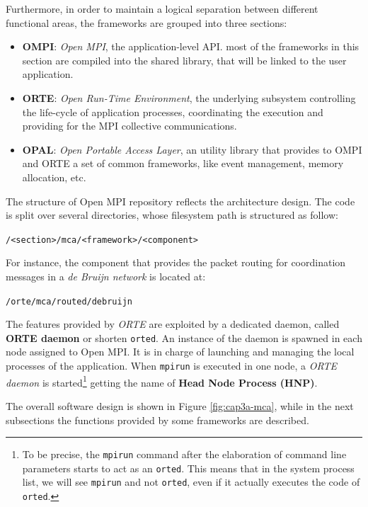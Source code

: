 Furthermore, in order to maintain a logical separation between different
functional areas, the frameworks are grouped into three sections:
\begin{itemize}
\item \textbf{OMPI}: \emph{Open MPI}, the application-level API.
                     most of the frameworks in this section are compiled into
                     the shared library, that will be linked to the user
                     application.  
\item \textbf{ORTE}: \emph{Open Run-Time Environment}, the underlying
                     subsystem controlling the life-cycle of application
                     processes, coordinating the execution and providing for
                     the MPI collective communications.
\item \textbf{OPAL}: \emph{Open Portable Access Layer}, an utility library
                     that provides to OMPI and ORTE a set of common frameworks,
                     like event management, memory allocation, etc.
\end{itemize}

The structure of Open MPI repository reflects the architecture design. The code
is split over several directories, whose filesystem path is structured
as follow:

\texttt{/<section>/mca/<framework>/<component>}

For instance, the component that provides the packet routing for coordination
messages in a \emph{de Bruijn network} is located at:

\texttt{/orte/mca/routed/debruijn}

The features provided by \emph{ORTE} are exploited by a dedicated daemon, called
\textbf{ORTE daemon} or shorten \texttt{orted}. An instance of the daemon is
spawned in each
node assigned to Open MPI. It is in charge of launching and managing the local
processes of the application. When \texttt{mpirun} is executed in one node, a
\emph{ORTE daemon} is started\footnote{To be precise, the \texttt{mpirun}
command after the elaboration of command line parameters starts to act as an
\texttt{orted}. This means that in the system
process list, we will see \texttt{mpirun} and not \texttt{orted}, even if it
actually executes the code of \texttt{orted}.} getting
the name of \textbf{Head Node Process (HNP)}.

The overall software design is shown in Figure \ref{fig:cap3a-mca}, while in
the next subsections the functions provided by some frameworks are described.

